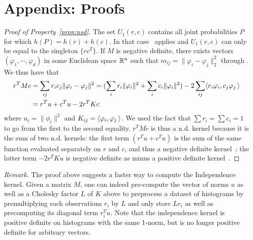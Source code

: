 \documentclass{amsart} %
\providecommand{\norm}[1]{\lVert#1\rVert}
\begin{document}
\section{Appendix: Proofs}

\begin{proof}[Proof of Property~\ref{prop:nsd}]
The set $U_1(r,c)$ contains all joint probabilities $P$ for which $h(P)=h(r)+h(c)$. In that case~\citep[Theorem 2.6.6]{cover91elements} applies and $U_1(r,c)$ can only be equal to the singleton $\{rc^T\}$. If $M$ is negative definite, there exists vectors $(\varphi_1,\cdots,\varphi_d)$ in some Euclidean space $\mathbb{R}^n$ such that $m_{ij}=\norm{\varphi_i-\varphi_j}_2^2$	through \citep[\S3.3.2]{berg84harmonic}. We thus have that 
$$\begin{aligned}r^TM c&= \sum_{ij}r_i c_j \norm{\varphi_i-\varphi_j}^2= (\sum_{i}r_i \norm{\varphi_i}^2 + \sum_{i} c_i \norm{\varphi_i}^2) - 2\sum_{ij} \dotprod{r_i\varphi_i}{c_j\varphi_j}\\&= r^Tu + c^Tu - 2 r^TK c\end{aligned}$$
where $u_i=\norm{\phi_i}^2$ and $K_{ij}=\langle \varphi_i , \varphi_j\,\rangle$. We used the fact that $\sum r_i=\sum c_i=1$ to go from the first to the second equality. $r^TMc$ is thus a n.d. kernel because it is the sum of two n.d. kernels: the first term $(r^Tu+c^Tu)$ is the sum of the same function evaluated separately on $r$ and $c$, and thus a negative definite kernel~\citep[\S3.2.10]{berg84harmonic}; the latter term $-2r^TKu$ is negative definite as minus a positive definite kernel~\citep[Definition \S3.1.1]{berg84harmonic}.\end{proof}	
\emph{Remark.} The proof above suggests a faster way to compute the Independence kernel. Given a matrix $M$, one can indeed pre-compute the vector of norms $u$ as well as a Cholesky factor $L$ of $K$ above to preprocess a dataset of histograms by premultiplying each observations $r_i$ by $L$ and only store $Lr_i$ as well as precomputing its diagonal term $r_i^Tu$. Note that the independence kernel is positive definite on histograms with the same 1-norm, but is no longer positive definite for arbitrary vectors.
\end{document}
